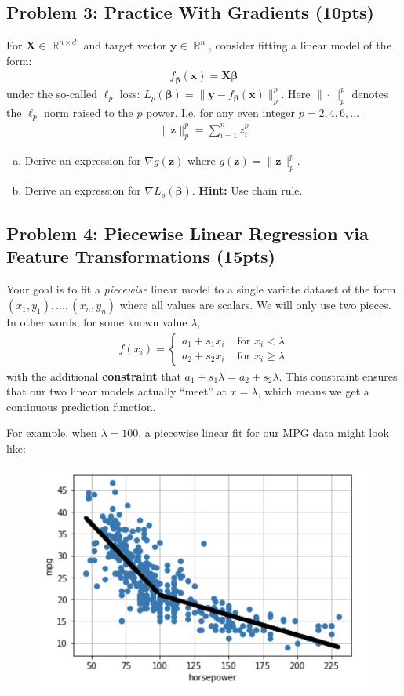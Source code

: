 \documentclass[10pt]{article}
\newcommand{\bs}[1]{\boldsymbol{#1}}
\newcommand{\bv}[1]{\mathbf{#1}}
\DeclareMathOperator{\R}{\mathbb{R}}
\begin{document}
\subsection{Problem 3: Practice With Gradients (10pts)}
For $\bv{X} \in \R^{n\times d}$ and target vector $\bv{y} \in \R^n$, consider fitting a linear model of the form:
\begin{align*}
f_{\bs{\beta}}(\bv{x}) = \bv{X}\bs{\beta}
\end{align*}
under the so-called $\ell_p$ loss: $L_p(\bs{\beta}) = \|\bv{y} - f_{\bs{\beta}}(\bv{x})\|_p^p$. Here $\|\cdot \|_p^p$ denotes the $\ell_p$ norm raised to the $p$ power. I.e. for any even integer $p = 2,4,6, \ldots$
\begin{align*}
\|\bv{z}\|_p^p = \sum_{i=1}^n z_i^p
\end{align*}

\begin{enumerate}[(a)]
	\item Derive an expression for $\nabla g(\bv{z})$ where $g(\bv{z}) = \|\bv{z}\|_p^p$. 
	
	\item Derive an expression for $\nabla L_p(\bs{\beta})$. \textbf{Hint:} Use chain rule.
\end{enumerate}

\subsection{Problem 4: Piecewise Linear Regression via Feature Transformations (15pts)}
Your goal is to fit a \emph{piecewise} linear model to a single variate dataset of the form $(x_1, y_1), \ldots, (x_n, y_n)$ where all values are scalars. We will only use two pieces. In other words, for some known value $\lambda$, 
\begin{align*}
f(x_i) = \begin{cases}
a_1 + s_1x_i & \text{ for $x_i < \lambda$}\\ 
a_2 + s_2x_i & \text{ for $x_i \geq \lambda$}
\end{cases}
\end{align*}
with the additional \textbf{constraint} that $a_1 + s_1\lambda = a_2 + s_2\lambda$. This constraint ensures that our two linear models actually ``meet'' at $x = \lambda$, which means we get a continuous prediction function.

For example, when $\lambda = 100$, a piecewise linear fit for our MPG data might look like:
\begin{figure}[H]
	\centering
	\includegraphics[width=.4\textwidth]{piecewise_fit.png} 
\end{figure}
\end{document}
